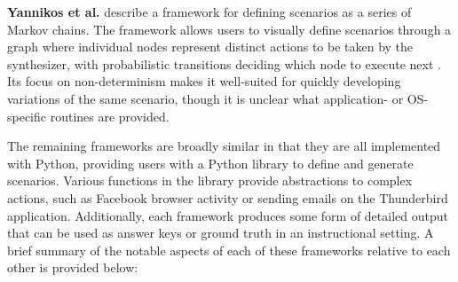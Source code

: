 \textbf{Yannikos et al.} describe a framework for defining scenarios as
a series of Markov chains. The framework allows users to visually define
scenarios through a graph where individual nodes represent distinct
actions to be taken by the synthesizer, with probabilistic transitions
deciding which node to execute next
\cite{yannikosDataCorporaDigital2014}. Its focus on non-determinism
makes it well-suited for quickly developing variations of the same
scenario, though it is unclear what application- or OS-specific routines
are provided.

The remaining frameworks are broadly similar in that they are all
implemented with Python, providing users with a Python library to define
and generate scenarios. Various functions in the library provide
abstractions to complex actions, such as Facebook browser activity or
sending emails on the Thunderbird application. Additionally, each
framework produces some form of detailed output that can be used as
answer keys or ground truth in an instructional setting. A brief summary
of the notable aspects of each of these frameworks relative to each
other is provided below:

